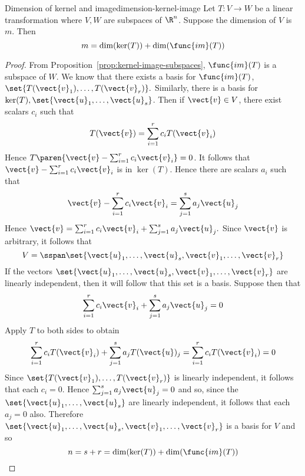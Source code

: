 \begin{theorem}{Dimension of kernel and image}{dimension-kernel-image}
Let $T:V\rightarrow W$ be a linear transformation where $V,W$ are subspaces of $\R^n$. Suppose the dimension of $V$ is $m$. Then 
\[
m=\dim (\ker (T)) +\dim (\func{im}(
T)) 
\]
\end{theorem}

\begin{proof}
From Proposition~\ref{prop:kernel-image-subspaces}, $\func{im}(T) $ is a subspace of $W$. We know that there exists a basis for $\func{im}(T)$, $\set{T(\vect{v}
_{1}),\ldots,T(\vect{v}_{r})} . $ Similarly, there is a basis for $\ker
(T) ,\set{\vect{u}_{1},\ldots,\vect{u}_{s}}$. Then if $
\vect{v}\in V$, there exist scalars $c_{i}$ such that 
\begin{equation*}
T(\vect{v})=\sum_{i=1}^{r}c_{i}T(\vect{v}_{i})
\end{equation*}
Hence $T\paren{\vect{v}-\sum_{i=1}^{r}c_{i}\vect{v}_{i}} =0$. It follows
that $\vect{v}-\sum_{i=1}^{r}c_{i}\vect{v}_{i}$ is in $\ker (T)$.
Hence there are scalars $a_{i}$ such that 
\begin{equation*}
\vect{v}-\sum_{i=1}^{r}c_{i}\vect{v}_{i}=\sum_{j=1}^{s}a_{j}\vect{u}_{j}
\end{equation*}
Hence $\vect{v}=\sum_{i=1}^{r}c_{i}\vect{v}_{i}+\sum_{j=1}^{s}a_{j}\vect{u}
_{j}. $ Since $\vect{v}$ is arbitrary, it follows that 
\begin{equation*}
V=\sspan\set{\vect{u}_{1},\ldots,\vect{u}_{s},\vect{v}_{1},\ldots,
\vect{v}_{r}}
\end{equation*}
If the vectors $\set{\vect{u}_{1},\ldots,\vect{u}_{s},\vect{v}_{1},\ldots,
\vect{v}_{r}} $ are linearly independent, then it will follow that
this set is a basis. Suppose then that 
\begin{equation*}
\sum_{i=1}^{r}c_{i}\vect{v}_{i}+\sum_{j=1}^{s}a_{j}\vect{u}_{j}=0
\end{equation*}
Apply $T$ to both sides to obtain 
\begin{equation*}
\sum_{i=1}^{r}c_{i}T(\vect{v}_{i})+\sum_{j=1}^{s}a_{j}T(\vect{u})
_{j}=\sum_{i=1}^{r}c_{i}T(\vect{v}_{i})=0
\end{equation*}
Since $\set{T(\vect{v}_{1}),\ldots,T(\vect{v}_{r})} $ is linearly
independent, it follows that each $c_{i}=0$. Hence $\sum_{j=1}^{s}a_{j}\vect{u
}_{j}=0$ and so, since the $\set{\vect{u}_{1},\ldots,\vect{u}_{s}} $
are linearly independent, it follows that each $a_{j}=0$ also. Therefore $\set{\vect{u}_{1},\ldots,\vect{u}_{s},\vect{v}_{1},\ldots,\vect{v}
_{r}} $ is a basis for $V$ and so 
\begin{equation*}
n=s+r=\dim (\ker (T)) +\dim (\func{im}(
T)) 
\end{equation*}
\end{proof}

